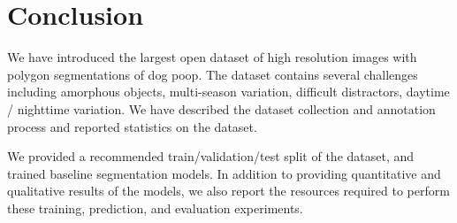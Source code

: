\documentclass{article}
\begin{document}







\section{Conclusion}

We have introduced the largest open dataset of high resolution images with polygon
  segmentations of dog poop.
The dataset contains several challenges including amorphous objects, multi-season variation, difficult
  distractors, daytime / nighttime variation.
We have described the dataset collection and annotation process and reported statistics on the dataset.

We provided a recommended train/validation/test split of the dataset, and trained
  baseline segmentation models.
In addition to providing quantitative and qualitative results of the models, we also report the resources
  required to perform these training, prediction, and evaluation experiments.
\end{document}
